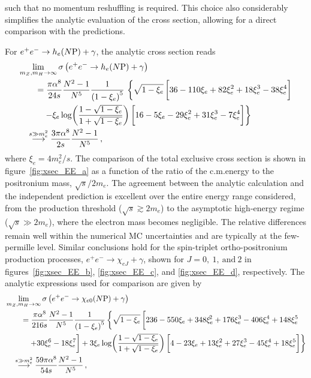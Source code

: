 \vspace{\fill}
\newpage\noindent
such that no momentum reshuffling is required. This choice also considerably simplifies the analytic evaluation of the cross section, allowing for a direct comparison with the \mgshort{} predictions. 

For $e^+e^-\to h_e(N\mathrm{P})+\gamma$, the analytic cross section reads
\begin{equation}
\begin{aligned}
    & \lim_{m_Z,m_H\to\infty}\sigma\left(e^+e^-\to h_e(N\mathrm{P})+\gamma\right)\\
    & \qquad = \dfrac{\pi\alpha^8}{24 s}\dfrac{N^2-1}{N^5}\dfrac{1}{\left(1 - \xi_{e}\right)^5}\, 
    \left\lbrace\sqrt{1 - \xi_{e}}\,\bigg\lbrack 36 - 110 \xi_{e} + 82 \xi_{e}^{2} + 18 \xi_{e}^{3} - 38 \xi_{e}^{4} \bigg\rbrack\right.\\
    &\qquad\quad \left. - \xi_{e}\log\!\left(\dfrac{1 - \sqrt{1 -\xi_{e}}}{1 + \sqrt{1 - \xi_{e}}}\right) \bigg\lbrack 16 - 5 \xi_{e} - 29 \xi_{e}^{2} + 31 \xi_{e}^{3} - 7 \xi_{e}^{4} \bigg\rbrack \right\rbrace\\
    & \quad 
    \overset{s\gg m_e^2}{\longrightarrow} \dfrac{3\pi\alpha^8}{2s}\dfrac{N^2-1}{N^5}\,,
\end{aligned}
\end{equation}
where $\xi_e=4m_e^2/s$.
The comparison of the total exclusive cross section is shown in figure~\ref{fig:xsec_EE_a} as a function of the ratio of the c.m.\@ energy to the positronium mass, $\sqrt{s}/2m_e$. The agreement between the analytic calculation and the independent \mgshort{} prediction is excellent over the entire energy range considered, from the production threshold ($\sqrt{s}\gtrsim 2m_e$) to the asymptotic high-energy regime ($\sqrt{s}\gg 2m_e$), where the electron mass becomes negligible. The relative differences remain well within the numerical MC uncertainties and are typically at the few-permille level.
Similar conclusions hold for the spin-triplet ortho-positronium production processes, $e^+e^-\to\chi_{eJ}+\gamma$, shown for $J=0,\ 1,\ \text{and}\ 2$ in figures~\ref{fig:xsec_EE_b}, \ref{fig:xsec_EE_c}, and \ref{fig:xsec_EE_d}, respectively. The analytic expressions used for comparison are given by
\begin{align}
    & \lim_{m_Z,m_H\to\infty}\sigma\left(e^+e^-\to\chi_{e 0}(N\mathrm{P})+\gamma\right)\nonumber \\
    &\qquad = \dfrac{\pi\alpha^8}{216s}\dfrac{N^2-1}{N^5}\dfrac{1}{\left(1-\xi_e\right)^5}\left\lbrace\sqrt{1-\xi_e}\,\bigg\lbrack 236  - 550 \xi_{e} + 348\xi_{e}^{\!2} + 176 \xi_{e}^{3} - 406 \xi_{e}^{4} + 148 \xi_{e}^{5}\right.\nonumber \\
    & \qquad\quad\left. + 30 \xi_{e}^{6} - 18 \xi_{e}^{7} \bigg\rbrack +3\xi_{e}\log\!\left(\dfrac{1-\sqrt{1-\xi_e}}{1+\sqrt{1-\xi_e}}\right)\bigg\lbrack 4 - 23 \xi_{e} + 13 \xi_{e}^{2}+ 27 \xi_{e}^{3} - 45 \xi_{e}^{4} + 18 \xi_{e}^{5} \bigg\rbrack\right\rbrace\nonumber\\
    &\quad\overset{s\gg m_e^2}{\longrightarrow} \dfrac{59\pi\alpha^8}{54s}\dfrac{N^2-1}{N^5}\,,
\end{align}

